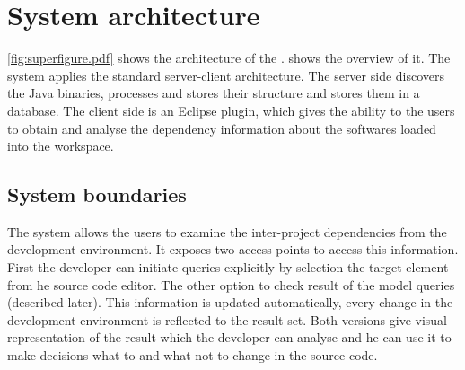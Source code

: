 % 
% 


 




\section{System architecture}

\autoref{fig:superfigure.pdf}  shows the architecture of the \ptool{}.
shows the overview of it. The system applies the standard server-client
architecture. The server side discovers the Java binaries, processes and stores
their structure and stores them in a database. The client side is an Eclipse
plugin, which gives the ability to the users to obtain and analyse the
dependency information about the softwares loaded into the workspace. 


\subsection{System boundaries}
The system allows the users to examine the inter-project dependencies from the
development environment. It exposes two access points to access this
information. First the developer can initiate queries explicitly by selection
the target element from  he source code editor. The other option to check result
of the model queries (described later). This information is updated
automatically, every change in the development environment is reflected to the
result set. Both versions give visual representation of the result which the
developer can analyse and he can use it to make decisions what to and what not
to change in the source code.



